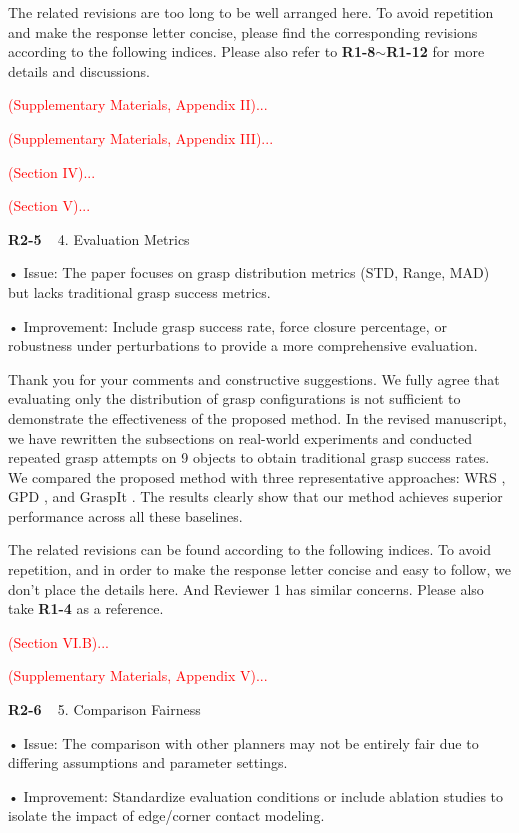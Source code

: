 \documentclass[journal]{IEEEtran}
\newcommand{\rev}[1]{\textcolor{red}{#1}}
\begin{document}
The related revisions are too long to be well arranged here. To avoid repetition and make the response letter concise, please find the corresponding revisions according to the following indices. Please also refer to \textbf{R1-8}$\sim$\textbf{R1-12} for more details and discussions. 

\rev{(Supplementary Materials, Appendix II)...}

\rev{(Supplementary Materials, Appendix III)...}

\rev{(Section IV)...}

\rev{(Section V)...}
\bigskip

\noindent
{\textbf{\color{black}R2-5 }\color{gray}~
4. Evaluation Metrics

• Issue: The paper focuses on grasp distribution metrics (STD, Range, MAD) but lacks traditional grasp success metrics.

• Improvement: Include grasp success rate, force closure percentage, or robustness under perturbations to provide a more comprehensive evaluation.
}

Thank you for your comments and constructive suggestions. We fully agree that evaluating only the distribution of grasp
configurations is not sufficient to demonstrate the effectiveness
of the proposed method. In the revised manuscript, we have rewritten the subsections on real-world experiments and conducted repeated grasp attempts on 9 objects to obtain traditional grasp success rates. We compared the proposed method with three representative approaches: WRS \cite{wan2020planning}, GPD \cite{ten2017grasp}, and GraspIt \cite{miller_graspit_2021}. The results clearly show that our method achieves superior performance across all these baselines.

The related revisions can be found according to the following indices. To avoid repetition, and in order to make the response letter concise and easy to follow, we don't place the details here. And Reviewer 1 has similar concerns. Please also take \textbf{R1-4} as a reference.

\rev{(Section VI.B)...}

\rev{(Supplementary Materials, Appendix V)...}

\bigskip

\noindent
{\textbf{\color{black}R2-6 }\color{gray}~
5. Comparison Fairness

• Issue: The comparison with other planners may not be entirely fair due to differing assumptions and parameter settings.

• Improvement: Standardize evaluation conditions or include ablation studies to isolate the impact of edge/corner contact modeling.
}
\end{document}
